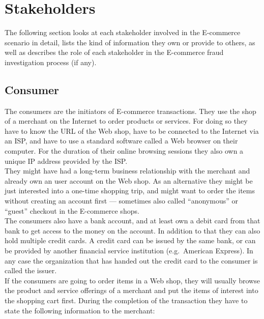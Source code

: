 
\section{Stakeholders}
\label{sec:stakeholder_analysis}

The following section looks at each stakeholder involved in the \gls{E-commerce} scenario in detail, lists the kind of information they own or provide to others, as well as describes the role of each stakeholder in the \gls{E-commerce} fraud investigation process (if any).

\subsection{Consumer}
\label{subsec:stakeholder_consumer}

The consumers are the initiators of \gls{E-commerce} transactions. They use the shop of a merchant on the Internet to order products or services. For doing so they have to know the \gls{URL} of the Web shop, have to be connected to the Internet via an \gls{ISP}, and have to use a standard software called a Web browser on their computer. For the duration of their online browsing sessions they also own a unique \gls{IP} address provided by the \gls{ISP}.\\

They might have had a long-term business relationship with the merchant and already own an user account on the Web shop. As an alternative they might be just interested into a one-time shopping trip, and might want to order the items without creating an account first --- sometimes also called ``anonymous'' or ``guest'' checkout in the \gls{E-commerce} shops. \\

The consumers also have a bank account, and at least own a debit card from that bank to get access to the money on the account. In addition to that they can also hold multiple credit cards. A credit card can be issued by the same bank, or can be provided by another financial service institution (e.g.\ American Express). In any case the organization that has handed out the credit card to the consumer is called the issuer. \\

If the consumers are going to order items in a Web shop, they will usually browse the product and service offerings of a merchant and put the items of interest into the shopping cart first. During the completion of the transaction they have to state the following information to the merchant:\@

